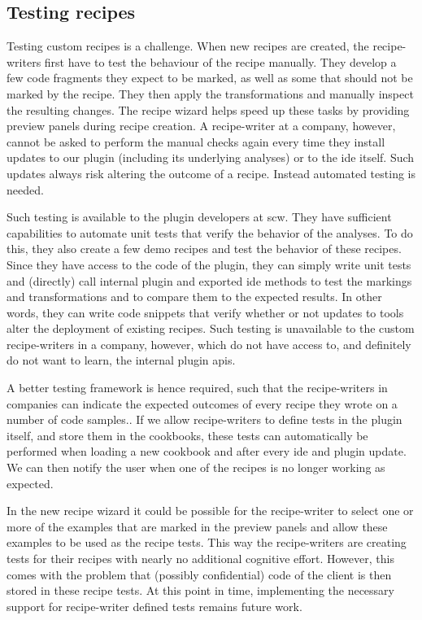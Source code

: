 \subsection{Testing recipes}
Testing custom recipes is a challenge.
When new recipes are created, the recipe-writers first have to test the behaviour of the recipe manually.
They develop a few code fragments they expect to be marked, as well as some that should not be marked by the recipe.
They then apply the transformations and manually inspect the resulting changes.
The recipe wizard helps speed up these tasks by providing preview panels during recipe creation.
A recipe-writer at a company, however, cannot be asked to perform the manual checks again every time they install updates to our plugin (including its underlying analyses) or to the \gls{ide} itself.
Such updates always risk altering the outcome of a recipe.
Instead automated testing is needed.

Such testing is available to the plugin developers at \gls{scw}.
They have sufficient capabilities to automate unit tests that verify the behavior of the analyses.
To do this, they also create a few demo recipes and test the behavior of these recipes.
Since they have access to the code of the plugin, they can simply write unit tests and (directly) call internal plugin and exported \gls{ide} methods to test the markings and transformations and to compare them to the expected results.
In other words, they can write code snippets that verify whether or not updates to tools alter the deployment of existing recipes.
Such testing is unavailable to the custom recipe-writers in a company, however, which do not have access to, and definitely do not want to learn, the internal plugin \glspl{api}.  

A better testing framework is hence required, such that the recipe-writers in companies can indicate the expected outcomes of every recipe they wrote on a number of code samples.. 
If we allow recipe-writers to define tests in the plugin itself, and store them in the cookbooks, these tests can automatically be performed when loading a new cookbook and after every \gls{ide} and plugin update.
We can then notify the user when one of the recipes is no longer working as expected.

In the new recipe wizard it could be possible for the recipe-writer to select one or more of the examples that are marked in the preview panels and allow these examples to be used as the recipe tests.
This way the recipe-writers are creating tests for their recipes with nearly no additional cognitive effort.
However, this comes with the problem that (possibly confidential) code of the client is then stored in these recipe tests.
At this point in time, implementing the necessary support for recipe-writer defined tests remains future work.

